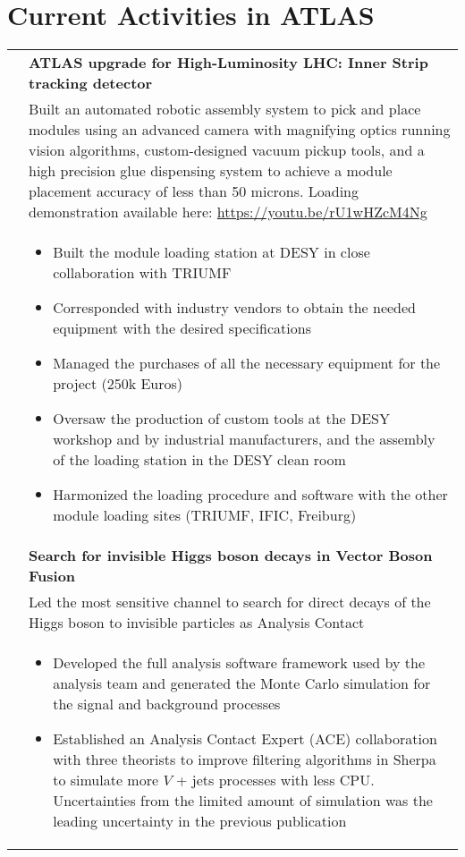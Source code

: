 \documentclass[a4paper,10pt]{article}
\begin{document}
\section{Current Activities in ATLAS}
\begin{tabularx}{\textwidth}{>{\centering\arraybackslash}X p{} }
{\bf Upgrade} &   \textbf{ATLAS upgrade for High-Luminosity LHC: Inner Strip tracking detector} \\
	& Built an automated robotic assembly system to pick and place modules using an advanced camera with magnifying optics running vision algorithms, custom-designed vacuum pickup tools, and a high precision glue dispensing system to achieve a module placement accuracy of less than 50 microns. Loading demonstration available here: \href{https://youtu.be/rU1wHZcM4Ng}{https://youtu.be/rU1wHZcM4Ng} \\
			& \begin{itemize}
			   \item Built the module loading station at DESY in close collaboration with TRIUMF
			   \item Corresponded with industry vendors to obtain the needed equipment with the desired specifications
			   \item Managed the purchases of all the necessary equipment for the project (250k Euros)
			   \item Oversaw the production of custom tools at the DESY workshop and by industrial manufacturers, and the assembly of the loading station in the DESY clean room
			   \item Harmonized the loading procedure and software with the other module loading sites (TRIUMF, IFIC, Freiburg)
			 \end{itemize} \\[-1.5ex]

{\bf Analysis} &  \textbf{Search for invisible Higgs boson decays in Vector Boson Fusion} \\
			   & Led the most sensitive channel to search for direct decays of the Higgs boson to invisible particles as Analysis Contact \\
			   & \begin{itemize}
			   \item Developed the full analysis software framework used by the analysis team and generated the Monte Carlo simulation for the signal and background processes
			   \item Established an Analysis Contact Expert (ACE) collaboration with three theorists to improve filtering algorithms in Sherpa to simulate more $V$ + jets processes with less CPU. Uncertainties from the limited amount of simulation was the leading uncertainty in the previous publication
			\end{itemize}
\end{tabularx}
\end{document}
